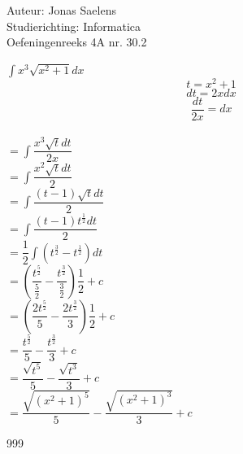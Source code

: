 \documentclass[a4paper]{article}
\begin{document}
\noindent \large Auteur: Jonas Saelens \\
\noindent \large Studierichting: Informatica\\
\noindent \large Oefeningenreeks 4A nr. 30.2\\

\medskip

\normalsize

$\displaystyle \int x^3 \sqrt{x^2+1} dx$ \\

$$ t=x^2+1$$ $$dt=2xdx$$ $$\dfrac{dt}{2x} = dx$$ \\

$= \displaystyle \int \dfrac{x^3 \sqrt{t} dt}{2x}$ \\

$= \displaystyle \int \dfrac{x^2 \sqrt{t} dt}{2}$ \\

$= \displaystyle \int \dfrac{\left( t-1 \right) \sqrt{t} dt}{2}$ \\

$= \displaystyle \int \dfrac{\left( t-1 \right) t^{\tfrac{1}{2}} dt}{2}$ \\

$= \dfrac{1}{2} \displaystyle \int \left( t^{\tfrac{3}{2}} - t^{\tfrac{1}{2}} \right)  dt$ \\

$= \left( \dfrac{t^{\tfrac{5}{2}}}{\tfrac{5}{2}} - \dfrac{t^{\tfrac{3}{2}}}{\tfrac{3}{2}} \right) \dfrac{1}{2} + c$ \\

$= \left( \dfrac{2t^{\tfrac{5}{2}}}{5} - \dfrac{2t^{\tfrac{3}{2}}}{3} \right) \dfrac{1}{2} + c$ \\

$= \dfrac{t^{\tfrac{5}{2}}}{5} - \dfrac{t^{\tfrac{3}{2}}}{3} + c$ \\

$= \dfrac{\sqrt{t^5}}{5} - \dfrac{\sqrt{t^3}}{3} + c$ \\

$= \dfrac{\sqrt{\left( x^2+1 \right)^5}}{5} - \dfrac{\sqrt{\left( x^2+1 \right)^3}}{3} + c$ \\


\begin{thebibliography}{999}
\end{thebibliography}
\end{document}
